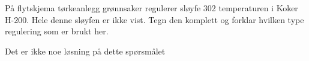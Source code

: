 

P{\aa} flytskjema t{\o}rkeanlegg gr{\o}nnsaker regulerer sl{\o}yfe 302 temperaturen i Koker H-200. Hele denne sl{\o}yfen er ikke vist. Tegn den komplett og forklar hvilken type regulering som er brukt her. 







Det er ikke noe l{\o}sning p{\aa} dette sp{\o}rsm{\aa}let













